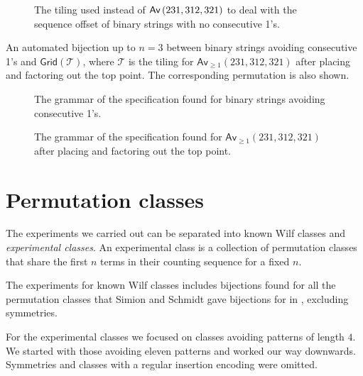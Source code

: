 \begin{figure}[ht!]
    \centering
    
    \caption{The tiling used instead of $\textsf{Av}\left(231,312,321\right)$ to deal with the sequence offset of binary strings with no consecutive 1's.}
    \label{fig:fibpermoffbyone}
\end{figure}

\begin{table}[ht!]
    \centering
    
    \caption{An automated bijection up to $n=3$ between binary strings avoiding consecutive 1's and $\textsf{Grid}(\mathcal{T})$, where $\mathcal{T}$ is the tiling for $\textsf{Av}_{\geq1}(231,312,321)$ after placing and factoring out the top point. The corresponding permutation is also shown.}
    \label{tab:wordtilmap}
\end{table}

\begin{figure}
    \centering
    
    \vspace*{-12.5mm}
    \caption{The grammar of the specification found for binary strings avoiding consecutive 1's.}
    \label{fig:fibwordtree}
\end{figure}
\begin{figure}
    \centering
    
    \vspace*{-14mm}
    \caption{The grammar of the specification found for $\textsf{Av}_{\geq1}(231,312,321)$ after placing and factoring out the top point.}
    \label{fig:fibpermtree}
\end{figure}

\section{Permutation classes}
The experiments we carried out can be separated into known Wilf classes and \emph{experimental classes}. An experimental class is a collection of permutation classes that share the first $n$ terms in their counting sequence for a fixed $n$.

The experiments for known Wilf classes includes bijections found for all the permutation classes that Simion and Schmidt gave bijections for in \cite{simionandschmidt}, excluding symmetries.

For the experimental classes we focused on classes avoiding patterns of length $4$. We started with those avoiding eleven patterns and worked our way downwards. Symmetries and classes with a regular insertion encoding were omitted. 


